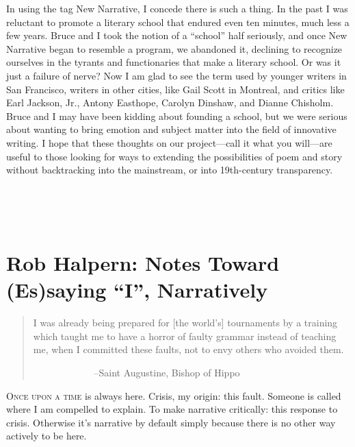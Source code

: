 \documentclass[
]{memoir}
\begin{document}
In using the tag New Narrative, I concede there is such a thing. In the
past I was reluctant to promote a literary school that endured even ten
minutes, much less a few years. Bruce and I took the notion of a
``school'' half seriously, and once New Narrative began to resemble a
program, we abandoned it, declining to recognize ourselves in the
tyrants and functionaries that make a literary school. Or was it just a
failure of nerve? Now I am glad to see the term used by younger writers
in San Francisco, writers in other cities, like Gail Scott in Montreal,
and critics like Earl Jackson, Jr., Antony Easthope, Carolyn Dinshaw,
and Dianne Chisholm. Bruce and I may have been kidding about founding a
school, but we were serious about wanting to bring emotion and subject
matter into the field of innovative writing. I hope that these thoughts
on our project---call it what you will---are useful to those looking for
ways to extending the possibilities of poem and story without
backtracking into the mainstream, or into 19th-century transparency.

~

~

\hypertarget{rob-halpern-notes-toward-essaying-i-narratively}{%
\chapter{Rob Halpern: Notes Toward (Es)saying ``I'',
Narratively}\label{rob-halpern-notes-toward-essaying-i-narratively}}

\begin{quote}
I was already being prepared for {[}the world's{]} tournaments by a
training which taught me to have a horror of faulty grammar instead of
teaching me, when I committed these faults, not to envy others who
avoided them.

~ ~~~~~~~~~~~--Saint Augustine, Bishop of Hippo
\end{quote}

\lettrine[lines=3, findent=0em, nindent=0.1em, lhang=0]{O}{nce upon a time}
is always here. Crisis, my origin: this fault. Someone is called where I
am compelled to explain. To make narrative critically: this response to
crisis. Otherwise it's narrative by default simply because there is no
other way actively to be here.

~
\end{document}
